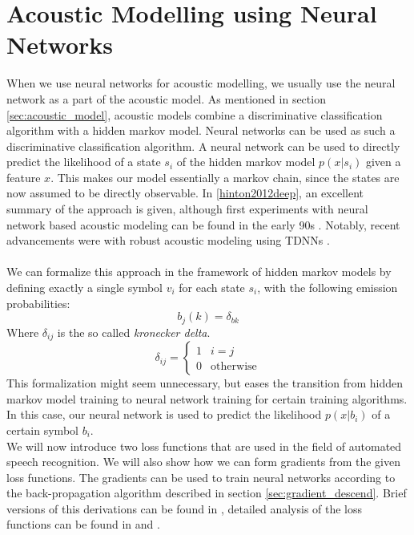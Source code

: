 \section{Acoustic Modelling using Neural Networks}

When we use neural networks for acoustic modelling, we usually use the neural network as a part of the acoustic model. As mentioned in section \ref{sec:acoustic_model}, acoustic models combine a discriminative classification algorithm with a hidden markov model. Neural networks can be used as such a discriminative classification algorithm. A neural network can be used to directly predict the likelihood of a state $s_i$ of the hidden markov model $p(x|s_i)$ given a feature $x$. This makes our model essentially a markov chain, since the states are now assumed to be directly observable. In \ref{hinton2012deep}, an excellent summary of the approach is given, although first experiments with neural network based acoustic modeling can be found in the early 90s \cite{bengio1993connectionist}. Notably, recent advancements were with robust acoustic modeling using TDNNs \cite{peddinti2015jhu}. \\ \\
We can formalize this approach in the framework of hidden markov models by defining exactly a single symbol $v_i$ for each state $s_i$, with the following emission probabilities:
\[
b_j(k) = \delta_{bk}
\]
Where $\delta_{ij}$ is the so called \textit{kronecker delta}.
\[
\delta_{ij} = \begin{cases}
1 & i = j\\
0 & \text{otherwise}
\end{cases} 
\]
This formalization might seem unnecessary, but eases the transition from hidden markov model training to neural network training for certain training algorithms. In this case, our neural network is used to predict the likelihood $p(x|b_i)$ of a certain symbol $b_i$.\\
We will now introduce two loss functions that are used in the field of automated speech recognition. We will also show how we can form gradients from the given loss functions. The gradients can be used to train neural networks according to the back-propagation algorithm described in section \ref{sec:gradient_descend}. Brief versions of this derivations can be found in \cite{ghoshal2013sequence}, detailed analysis of the loss functions can be found in \cite{gibson2008minimum} and \cite{povey2005discriminative}.
